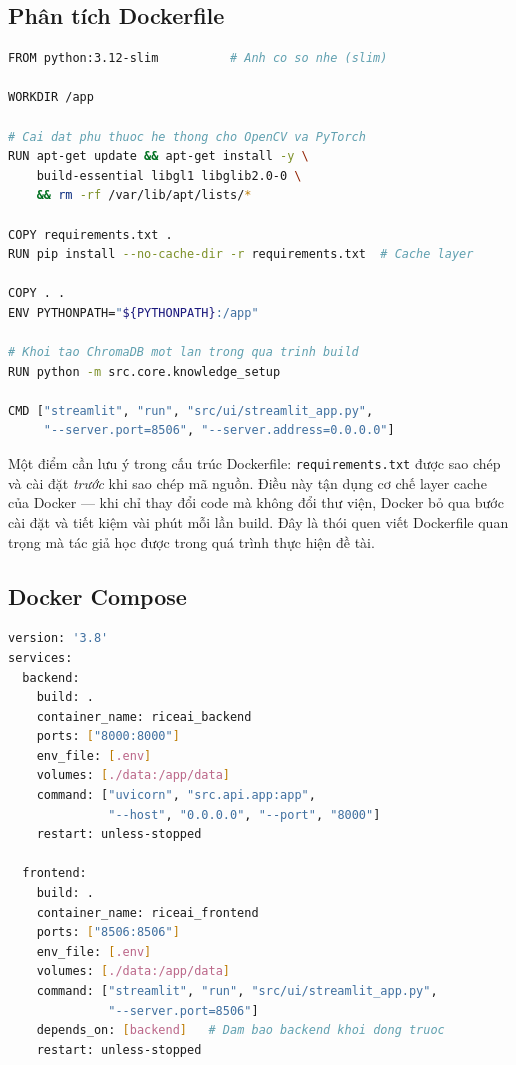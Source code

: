 \subsection{Phân tích Dockerfile}
\begin{lstlisting}[language=bash, caption={Dockerfile chính của hệ thống}, label={lst:dockerfile}, basicstyle=\ttfamily\small]
FROM python:3.12-slim          # Anh co so nhe (slim)

WORKDIR /app

# Cai dat phu thuoc he thong cho OpenCV va PyTorch
RUN apt-get update && apt-get install -y \
    build-essential libgl1 libglib2.0-0 \
    && rm -rf /var/lib/apt/lists/*

COPY requirements.txt .
RUN pip install --no-cache-dir -r requirements.txt  # Cache layer

COPY . .
ENV PYTHONPATH="${PYTHONPATH}:/app"

# Khoi tao ChromaDB mot lan trong qua trinh build
RUN python -m src.core.knowledge_setup

CMD ["streamlit", "run", "src/ui/streamlit_app.py",
     "--server.port=8506", "--server.address=0.0.0.0"]
\end{lstlisting}

Một điểm cần lưu ý trong cấu trúc Dockerfile: \texttt{requirements.txt} được sao chép và cài đặt \emph{trước} khi sao chép mã nguồn. Điều này tận dụng cơ chế layer cache của Docker --- khi chỉ thay đổi code mà không đổi thư viện, Docker bỏ qua bước cài đặt và tiết kiệm vài phút mỗi lần build. Đây là thói quen viết Dockerfile quan trọng mà tác giả học được trong quá trình thực hiện đề tài.
\newpage
\subsection{Docker Compose}
\begin{lstlisting}[language=bash, caption={Cấu hình docker-compose.yml}, label={lst:dockercompose}, basicstyle=\ttfamily\small]
version: '3.8'
services:
  backend:
    build: .
    container_name: riceai_backend
    ports: ["8000:8000"]
    env_file: [.env]
    volumes: [./data:/app/data]
    command: ["uvicorn", "src.api.app:app",
              "--host", "0.0.0.0", "--port", "8000"]
    restart: unless-stopped

  frontend:
    build: .
    container_name: riceai_frontend
    ports: ["8506:8506"]
    env_file: [.env]
    volumes: [./data:/app/data]
    command: ["streamlit", "run", "src/ui/streamlit_app.py",
              "--server.port=8506"]
    depends_on: [backend]   # Dam bao backend khoi dong truoc
    restart: unless-stopped
\end{lstlisting}
\newpage
